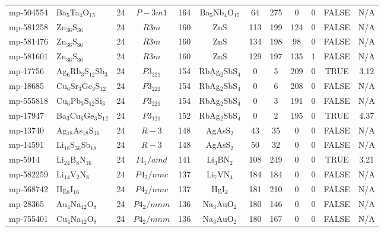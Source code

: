 {\begin{longtable}{llcccccccccc}
    mp-504554 & Ba$_{5}$Ta$_{4}$O$_{15}$ & 24    & $P-3m1$ & 164   & Ba$_{5}$Nb$_{4}$O$_{15}$ & 64    & 275   & 0     & 0     & FALSE & N/A \\
    mp-581258 & Zn$_{36}$S$_{36}$ & 24    & $R3m$ & 160   & ZnS   & 113   & 199   & 124   & 0     & FALSE & N/A \\
    mp-581476 & Zn$_{36}$S$_{36}$ & 24    & $R3m$ & 160   & ZnS   & 134   & 198   & 98    & 0     & FALSE & N/A \\
    mp-581601 & Zn$_{36}$S$_{36}$ & 24    & $R3m$ & 160   & ZnS   & 129   & 197   & 135   & 1     & FALSE & N/A \\
    mp-17756 & Ag$_{6}$Rb$_{3}$S$_{12}$Sb$_{3}$ & 24    & $P3_221$ & 154   & RbAg$_{2}$SbS$_{4}$ & 0     & 5     & 209   & 0     & TRUE  & 3.12  \\
    mp-18685 & Cu$_{6}$Sr$_{3}$Ge$_{3}$S$_{12}$ & 24    & $P3_221$ & 154   & RbAg$_{2}$SbS$_{4}$ & 0     & 6     & 208   & 0     & FALSE & N/A \\
    mp-555818 & Cu$_{6}$Pb$_{3}$S$_{12}$Si$_{3}$ & 24    & $P3_221$ & 154   & RbAg$_{2}$SbS$_{4}$ & 0     & 3     & 191   & 0     & FALSE & N/A \\
    mp-17947 & Ba$_{3}$Cu$_{6}$Ge$_{3}$S$_{12}$ & 24    & $P3_121$ & 152   & RbAg$_{2}$SbS$_{4}$ & 0     & 2     & 195   & 0     & TRUE  & 4.37  \\
    mp-13740 & Ag$_{18}$As$_{18}$S$_{36}$ & 24    & $R-3$ & 148   & AgAsS$_{2}$ & 43    & 35    & 0     & 0     & FALSE & N/A \\
    mp-14591 & Li$_{18}$S$_{36}$Sb$_{18}$ & 24    & $R-3$ & 148   & AgAsS$_{2}$ & 50    & 32    & 0     & 0     & FALSE & N/A \\
    mp-5914 & Li$_{24}$B$_{8}$N$_{16}$ & 24    & $I4_1/amd$ & 141   & Li$_{3}$BN$_{2}$ & 108   & 249   & 0     & 0     & TRUE  & 3.21  \\
    mp-582259 & Li$_{14}$V$_{2}$N$_{8}$ & 24    & $P4_2/nmc$ & 137   & Li$_{7}$VN$_{4}$ & 184   & 184   & 0     & 0     & FALSE & N/A \\
    mp-568742 & Hg$_{8}$I$_{16}$ & 24    & $P4_2/nmc$ & 137   & HgI$_{2}$ & 181   & 210   & 0     & 0     & FALSE & N/A \\
    mp-28365 & Au$_{4}$Na$_{12}$O$_{8}$ & 24    & $P4_2/mnm$ & 136   & Na$_{3}$AuO$_{2}$ & 180   & 146   & 0     & 0     & FALSE & N/A \\
    mp-755401 & Cu$_{4}$Na$_{12}$O$_{8}$ & 24    & $P4_2/mnm$ & 136   & Na$_{3}$AuO$_{2}$ & 180   & 167   & 0     & 0     & FALSE & N/A \\

\end{longtable}}
